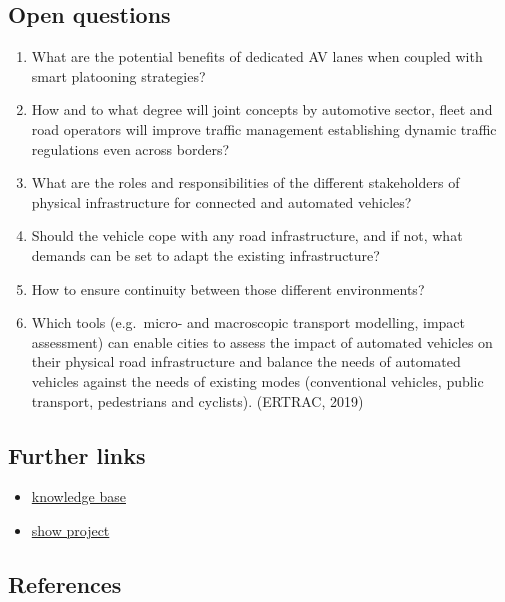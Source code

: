 \documentclass[
]{book}
\providecommand{\tightlist}{%
  \setlength{\itemsep}{0pt}\setlength{\parskip}{0pt}}
\begin{document}
\hypertarget{open-questions}{%
\subsection*{Open questions}\label{open-questions}}

\begin{enumerate}
\def\labelenumi{\arabic{enumi}.}
\tightlist
\item
  What are the potential benefits of dedicated AV lanes when coupled with smart platooning strategies?
\item
  How and to what degree will joint concepts by automotive sector, fleet and road
  operators will improve traffic management establishing dynamic traffic regulations even across
  borders?
\item
  What are the roles and responsibilities of the different stakeholders of physical infrastructure for connected and automated vehicles?
\item
  Should the vehicle cope with any road infrastructure, and if not, what demands can be set to adapt the existing infrastructure?
\item
  How to ensure continuity between those different environments?
\item
  Which tools (e.g.~micro- and macroscopic transport modelling, impact assessment) can enable
  cities to assess the impact of automated vehicles on their physical road infrastructure and
  balance the needs of automated vehicles against the needs of existing modes (conventional
  vehicles, public transport, pedestrians and cyclists). (ERTRAC, 2019)
\end{enumerate}

\hypertarget{further-links}{%
\subsection*{Further links}\label{further-links}}

\begin{itemize}
\tightlist
\item
  \href{https://knowledge-base.connectedautomateddriving.eu/wp-content/uploads/2019/12/SMART_2010-0064-study-report-final_V1-2.pdf}{knowledge base}
\item
  \href{https://show-project.eu/}{show project}
\end{itemize}

\hypertarget{references}{%
\subsection*{References}\label{references}}
\end{document}
